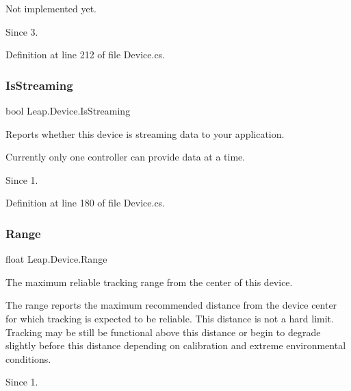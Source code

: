 Not implemented yet. \begin{DoxySince}{Since}
3. 
\end{DoxySince}


Definition at line 212 of file Device.\+cs.

\mbox{\label{class_leap_1_1_device_ae809e2e9f708ce086fe501ed1a768cbf}} 
\subsubsection{\texorpdfstring{IsStreaming}{IsStreaming}}
{\footnotesize\ttfamily bool Leap.\+Device.\+Is\+Streaming\hspace{0.3cm}{\ttfamily [get]}}



Reports whether this device is streaming data to your application. 

Currently only one controller can provide data at a time. \begin{DoxySince}{Since}
1. 
\end{DoxySince}


Definition at line 180 of file Device.\+cs.

\mbox{\label{class_leap_1_1_device_a8729f506b9a31c00af2143dc47704b88}} 
\subsubsection{\texorpdfstring{Range}{Range}}
{\footnotesize\ttfamily float Leap.\+Device.\+Range\hspace{0.3cm}{\ttfamily [get]}}



The maximum reliable tracking range from the center of this device. 

The range reports the maximum recommended distance from the device center for which tracking is expected to be reliable. This distance is not a hard limit. Tracking may be still be functional above this distance or begin to degrade slightly before this distance depending on calibration and extreme environmental conditions.

\begin{DoxySince}{Since}
1. 
\end{DoxySince}


